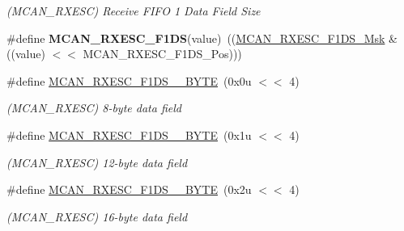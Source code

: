 \begin{DoxyCompactItemize}
\begin{DoxyCompactList}\small\item\em (M\+C\+A\+N\+\_\+\+R\+X\+E\+SC) Receive F\+I\+FO 1 Data Field Size \end{DoxyCompactList}\item 
\mbox{\label{group__SAMV71__MCAN_ga0ec0fdef1bcb00794cad047752966913}} 
\#define {\bfseries M\+C\+A\+N\+\_\+\+R\+X\+E\+S\+C\+\_\+\+F1\+DS}(value)~((\mbox{\hyperlink{group__SAMV71__MCAN_ga73140fa88a89dccc958dfcb691290313}{M\+C\+A\+N\+\_\+\+R\+X\+E\+S\+C\+\_\+\+F1\+D\+S\+\_\+\+Msk}} \& ((value) $<$$<$ M\+C\+A\+N\+\_\+\+R\+X\+E\+S\+C\+\_\+\+F1\+D\+S\+\_\+\+Pos)))
\item 
\mbox{\label{group__SAMV71__MCAN_gac5078bd88a9f1275828fdb52c91f6f4e}} 
\#define \mbox{\hyperlink{group__SAMV71__MCAN_gac5078bd88a9f1275828fdb52c91f6f4e}{M\+C\+A\+N\+\_\+\+R\+X\+E\+S\+C\+\_\+\+F1\+D\+S\+\_\+\_\+\+B\+Y\+TE}}~(0x0u $<$$<$ 4)
\begin{DoxyCompactList}\small\item\em (M\+C\+A\+N\+\_\+\+R\+X\+E\+SC) 8-\/byte data field \end{DoxyCompactList}\item 
\mbox{\label{group__SAMV71__MCAN_ga551fbea6a7b0bbcd4d4a95539f161857}} 
\#define \mbox{\hyperlink{group__SAMV71__MCAN_ga551fbea6a7b0bbcd4d4a95539f161857}{M\+C\+A\+N\+\_\+\+R\+X\+E\+S\+C\+\_\+\+F1\+D\+S\+\_\+\_\+\+B\+Y\+TE}}~(0x1u $<$$<$ 4)
\begin{DoxyCompactList}\small\item\em (M\+C\+A\+N\+\_\+\+R\+X\+E\+SC) 12-\/byte data field \end{DoxyCompactList}\item 
\mbox{\label{group__SAMV71__MCAN_gaf103699a2aa9a0419002443948ec891b}} 
\#define \mbox{\hyperlink{group__SAMV71__MCAN_gaf103699a2aa9a0419002443948ec891b}{M\+C\+A\+N\+\_\+\+R\+X\+E\+S\+C\+\_\+\+F1\+D\+S\+\_\+\_\+\+B\+Y\+TE}}~(0x2u $<$$<$ 4)
\begin{DoxyCompactList}\small\item\em (M\+C\+A\+N\+\_\+\+R\+X\+E\+SC) 16-\/byte data field \end{DoxyCompactList}\item 
\mbox{\label{group__SAMV71__MCAN_gae65f44ba4bcad71c503ffcbdee1f4166}} 

\end{DoxyCompactItemize}
